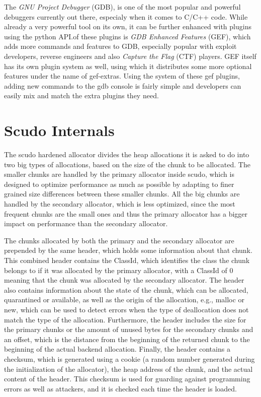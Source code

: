 \documentclass[a4paper,11pt,oneside]{report}
\begin{document}
The \emph{GNU Project Debugger} (GDB), is one of the most popular and powerful
debuggers currently out there, especialy when it comes to C/C++ code. While
already a very powerful tool on its own, it can be further enhanced with
plugins using the python API.\@One of these plugins is \emph{GDB Enhanced Features}
(GEF), which adds more commands and features to GDB, especially popular with
exploit developers, reverse engineers and also \emph{Capture the Flag} (CTF)
players. GEF itself has its own plugin system as well, using which it distributes
some more optional features under the name of gef-extras. Using the system of
these gef plugins, adding new commands to the gdb console is fairly simple and
developers can easily mix and match the extra plugins they need.


\chapter{Scudo Internals}


The scudo hardened allocator divides the heap allocations it is asked to do into
two big types of allocations, based on the size of the chunk to be allocated.
The smaller chunks are handled by the primary allocator inside scudo, which is
designed to optimize performance as much as possible by adapting to finer grained
size differences between these smaller chunks. All the big chunks are handled by
the secondary allocator, which is less optimized, since the most frequent chunks
are the small ones and thus the primary allocator has a bigger impact on performance
than the secondary allocator.


The chunks allocated by both the primary and the secondary allocator are prepended
by the same header, which holds some information about that chunk. This combined
header contains the ClassId, which identifies the class the chunk belongs to if
it was allocated by the primary allocator, with a ClassId of 0 meaning that the
chunk was allocated by the secondary allocator. The header also contains information
about the state of the chunk, which can be allocated, quarantined or available, as
well as the origin of the allocation, e.g., malloc or new, which can be used to
detect errors when the type of deallocation does not match the type of the
allocation. Furthermore, the header includes the size for the primary chunks or
the amount of unused bytes for the secondary chunks and an offset, which is the
distance from the beginning of the returned chunk to the beginning of the actual
backend allocation. Finally, the header contains a checksum, which is generated
using a cookie (a random number generated during the initialization of the
allocator), the heap address of the chunk, and the actual content of the header.
This checksum is used for guarding against programming errors as well as attackers,
and it is checked each time the header is loaded.
\end{document}
